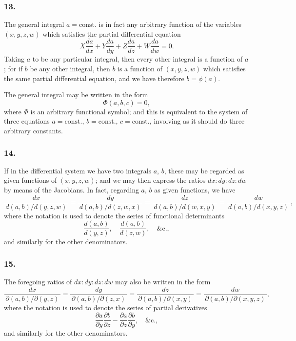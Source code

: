 \documentclass[11pt,a4paper]{book}
\begin{document}
\newpage
\setcounter{page}{120}

\subsubsection*{13.}

The general integral $a = \text{const.}$ is in fact any arbitrary function of the variables $(x, y, z, w)$ which satisfies the partial differential equation
\[
X\frac{da}{dx} + Y\frac{da}{dy} + Z\frac{da}{dz} + W\frac{da}{dw} = 0.
\]
Taking $a$ to be any particular integral, then every other integral is a function of $a$; for if $b$ be any other integral, then $b$ is a function of $(x, y, z, w)$ which satisfies the same partial differential equation, and we have therefore $b = \phi(a)$.

The general integral may be written in the form
\[
\Phi(a, b, c) = 0,
\]
where $\Phi$ is an arbitrary functional symbol; and this is equivalent to the system of three equations $a = \text{const.}$, $b = \text{const.}$, $c = \text{const.}$, involving as it should do three arbitrary constants.

\subsubsection*{14.}

If in the differential system we have two integrals $a$, $b$, these may be regarded as given functions of $(x, y, z, w)$; and we may then express the ratios $dx : dy : dz : dw$ by means of the Jacobians. In fact, regarding $a$, $b$ as given functions, we have
\[
\frac{dx}{\,d(a, b)/d(y, z, w)\,} = \frac{dy}{\,d(a, b)/d(z, w, x)\,} = \frac{dz}{\,d(a, b)/d(w, x, y)\,} = \frac{dw}{\,d(a, b)/d(x, y, z)\,},
\]
where the notation is used to denote the series of functional determinants
\[
\frac{d(a, b)}{d(y, z)}, \quad \frac{d(a, b)}{d(z, w)}, \quad \&\text{c.},
\]
and similarly for the other denominators.

\subsubsection*{15.}

The foregoing ratios of $dx : dy : dz : dw$ may also be written in the form
\[
\frac{dx}{\,\partial(a, b)/\partial(y, z)\,} = \frac{dy}{\,\partial(a, b)/\partial(z, x)\,} = \frac{dz}{\,\partial(a, b)/\partial(x, y)\,} = \frac{dw}{\,\partial(a, b)/\partial(x, y, z)\,},
\]
where the notation is used to denote the series of partial derivatives
\[
\frac{\partial a}{\partial y}\frac{\partial b}{\partial z} - \frac{\partial a}{\partial z}\frac{\partial b}{\partial y}, \quad \&\text{c.},
\]
and similarly for the other denominators.
\end{document}
